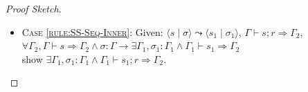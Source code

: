 \documentclass[twoside, english, final]{sdqthesis}
\newcommand{\tuple}[2]{\langle #1 \mid #2 \rangle}
\newcommand{\bbracket}[1]{\llbracket #1 \rrbracket}
\newcommand{\tr}[0]{\triangleright}
\theoremstyle{definition}
\begin{document}
\begin{proof}[Proof Sketch]
\begin{itemize}
\begin{itemize}
    \end{itemize} 
    




  \item \textsc{Case \cref{rule:SS-Seq-Inner}}:
    Given: $\tuple{s}{\sigma} \leadsto \tuple{s_1}{\sigma_1}$, 
     $\Gamma \vdash s; r \Rightarrow \Gamma_2$, \\
     $\forall \Gamma_2, \Gamma \vdash s \Rightarrow \Gamma_2 \wedge \sigma : \Gamma \to \exists \Gamma_1, \sigma_1 : \Gamma_1 \wedge \Gamma_1 \vdash s_1 \Rightarrow \Gamma_2$ \\
    show $\exists \Gamma_1, \sigma_1 : \Gamma_1 \wedge \Gamma_1 \vdash s_1 ; r  \Rightarrow \Gamma_2$.


\end{itemize}
\end{proof}
\end{document}
